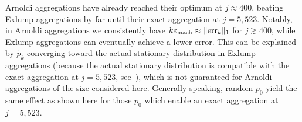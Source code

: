 \documentclass[runningheads]{llncs}
\newcommand*{\errvec}{\mathrm{err}}
\DeclarePairedDelimiter{\norm}{\lVert}{\rVert}
\begin{document}
Arnoldi aggregations have already reached their optimum at $j \approx 400$, beating Exlump aggregations by far until their exact aggregation at $j = 5{,}523$.
Notably, in Arnoldi aggregations we consistently have $k  \varepsilon_{\mathrm{mach}} \approx \norm{\errvec_k}_1$ for $j \gtrsim 400$, while Exlump aggregations can eventually achieve a lower error.
This can be explained by $\tilde{p}_k$ converging toward the actual stationary distribution in Exlump aggregations (because the actual stationary distribution is compatible with the exact aggregation at $j=5{,}523$, see~\cite[Theorem~3]{buchholz1994lumpability}), which is not guaranteed for Arnoldi aggregations of the size considered here.
Generally speaking, random $p_0$ yield the same effect as shown here for those $p_0$ which enable an exact aggregation at $j = 5{,}523$.
\end{document}
